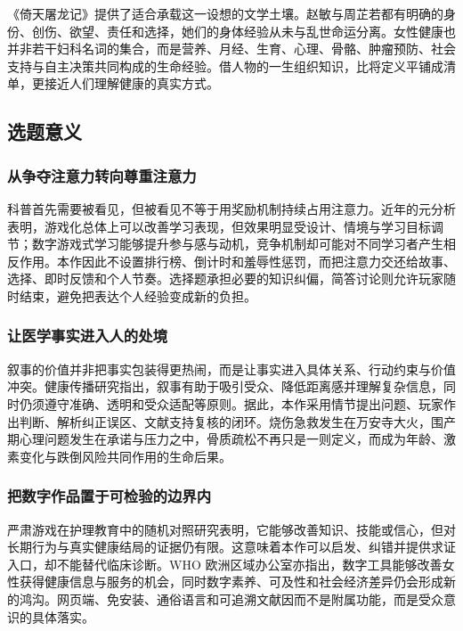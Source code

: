 \documentclass[lang=cn,a4paper,11pt,citestyle=gb7714-2015,bibstyle=gb7714-2015]{elegantpaper}
\begin{document}
《倚天屠龙记》提供了适合承载这一设想的文学土壤。赵敏与周芷若都有明确的身份、创伤、欲望、责任和选择，她们的身体经验从未与乱世命运分离。女性健康也并非若干妇科名词的集合，而是营养、月经、生育、心理、骨骼、肿瘤预防、社会支持与自主决策共同构成的生命经验。借人物的一生组织知识，比将定义平铺成清单，更接近人们理解健康的真实方式。

\subsection{选题意义}

\subsubsection{从争夺注意力转向尊重注意力}

科普首先需要被看见，但被看见不等于用奖励机制持续占用注意力。近年的元分析表明，游戏化总体上可以改善学习表现，但效果明显受设计、情境与学习目标调节\cite{zeng2024gamification}；数字游戏式学习能够提升参与感与动机，竞争机制却可能对不同学习者产生相反作用\cite{nadeem2023engagement}。本作因此不设置排行榜、倒计时和羞辱性惩罚，而把注意力交还给故事、选择、即时反馈和个人节奏。选择题承担必要的知识纠偏，简答讨论则允许玩家随时结束，避免把表达个人经验变成新的负担。

\subsubsection{让医学事实进入人的处境}

叙事的价值并非把事实包装得更热闹，而是让事实进入具体关系、行动约束与价值冲突。健康传播研究指出，叙事有助于吸引受众、降低距离感并理解复杂信息，同时仍须遵守准确、透明和受众适配等原则\cite{dudley2023narrative}。据此，本作采用情节提出问题、玩家作出判断、解析纠正误区、文献支持复核的闭环。烧伤急救发生在万安寺大火，围产期心理问题发生在承诺与压力之中，骨质疏松不再只是一则定义，而成为年龄、激素变化与跌倒风险共同作用的生命后果。

\subsubsection{把数字作品置于可检验的边界内}

严肃游戏在护理教育中的随机对照研究表明，它能够改善知识、技能或信心，但对长期行为与真实健康结局的证据仍有限\cite{lee2024seriousgames}。这意味着本作可以启发、纠错并提供求证入口，却不能替代临床诊断。WHO 欧洲区域办公室亦指出，数字工具能够改善女性获得健康信息与服务的机会，同时数字素养、可及性和社会经济差异仍会形成新的鸿沟\cite{who2024women}。网页端、免安装、通俗语言和可追溯文献因而不是附属功能，而是受众意识的具体落实。
\end{document}
